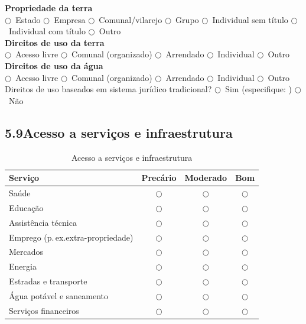 \noindent\textbf{Propriedade da terra}\\
$\bigcirc$~Estado \quad $\bigcirc$~Empresa \quad $\bigcirc$~Comunal/vilarejo \quad $\bigcirc$~Grupo \quad $\bigcirc$~Individual sem título \quad $\bigcirc$~Individual com título \quad $\bigcirc$~Outro\\[4pt]
\textbf{Direitos de uso da terra}\\
$\bigcirc$~Acesso livre \quad $\bigcirc$~Comunal (organizado) \quad $\bigcirc$~Arrendado \quad $\bigcirc$~Individual \quad $\bigcirc$~Outro\\[4pt]
\textbf{Direitos de uso da água}\\
$\bigcirc$~Acesso livre \quad $\bigcirc$~Comunal (organizado) \quad $\bigcirc$~Arrendado \quad $\bigcirc$~Individual \quad $\bigcirc$~Outro\\[4pt]
Direitos de uso baseados em sistema jurídico tradicional? $\bigcirc$~Sim (especifique: \dotfill) $\bigcirc$~Não

\subsection{5.9\quad Acesso a serviços e infraestrutura}

\begin{table}[htbp]
\centering\small
\caption{Acesso a serviços e infraestrutura}
\label{tab:app_services}
\begin{tabular}{lccc}
\toprule
\textbf{Serviço} & \textbf{Precário} & \textbf{Moderado} & \textbf{Bom} \\
\midrule
Saúde                         & $\bigcirc$ & $\bigcirc$ & $\bigcirc$ \\
Educação                      & $\bigcirc$ & $\bigcirc$ & $\bigcirc$ \\
Assistência técnica            & $\bigcirc$ & $\bigcirc$ & $\bigcirc$ \\
Emprego (p.\,ex.\@ extra-propriedade) & $\bigcirc$ & $\bigcirc$ & $\bigcirc$ \\
Mercados                      & $\bigcirc$ & $\bigcirc$ & $\bigcirc$ \\
Energia                       & $\bigcirc$ & $\bigcirc$ & $\bigcirc$ \\
Estradas e transporte          & $\bigcirc$ & $\bigcirc$ & $\bigcirc$ \\
Água potável e saneamento      & $\bigcirc$ & $\bigcirc$ & $\bigcirc$ \\
Serviços financeiros           & $\bigcirc$ & $\bigcirc$ & $\bigcirc$ \\
\bottomrule
\end{tabular}
\end{table}

